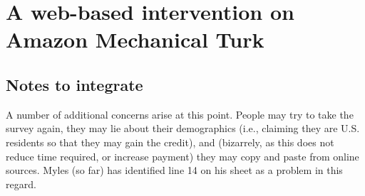 
\section{A web-based intervention on Amazon Mechanical Turk}

\subsection{Notes to integrate}

A number of additional concerns arise at this point. People may try to take the
survey again, they may lie about their demographics (i.e., claiming they are
U.S. residents so that they may gain the credit), and (bizarrely, as this does
not reduce time required, or increase payment) they may copy and paste from
online sources. Myles (so far) has identified line 14 on his sheet as a problem
in this regard.
